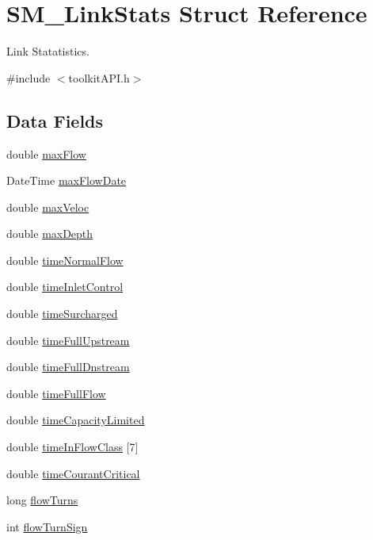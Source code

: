 \hypertarget{struct_s_m___link_stats}{}\section{S\+M\+\_\+\+Link\+Stats Struct Reference}
\label{struct_s_m___link_stats}


Link Statatistics.  




{\ttfamily \#include $<$toolkit\+A\+P\+I.\+h$>$}

\subsection*{Data Fields}
\begin{DoxyCompactItemize}
\item 
double \mbox{\hyperlink{struct_s_m___link_stats_a4d84bca5454f3903c44fe865e44674f5}{max\+Flow}}
\item 
Date\+Time \mbox{\hyperlink{struct_s_m___link_stats_a315e22b4b57846183e5c42beb0271461}{max\+Flow\+Date}}
\item 
double \mbox{\hyperlink{struct_s_m___link_stats_ad51aaaeab0403dcc9204d6fc10a150ba}{max\+Veloc}}
\item 
double \mbox{\hyperlink{struct_s_m___link_stats_a7228dabd4235761cf24edaa63c29ac5e}{max\+Depth}}
\item 
double \mbox{\hyperlink{struct_s_m___link_stats_a280dc840607ae09223dc876b8c56dd3a}{time\+Normal\+Flow}}
\item 
double \mbox{\hyperlink{struct_s_m___link_stats_aaa492ecf4dbe89b0492681c4fedfde2b}{time\+Inlet\+Control}}
\item 
double \mbox{\hyperlink{struct_s_m___link_stats_ae5c6e5a148cd0c7920e6298adccd4648}{time\+Surcharged}}
\item 
double \mbox{\hyperlink{struct_s_m___link_stats_af117df3659482483cc3893b1ff3e36aa}{time\+Full\+Upstream}}
\item 
double \mbox{\hyperlink{struct_s_m___link_stats_aaaf2b8def64575cf788c672c5096efd2}{time\+Full\+Dnstream}}
\item 
double \mbox{\hyperlink{struct_s_m___link_stats_a6a53d5ec23e7a135687343a689ac1e8a}{time\+Full\+Flow}}
\item 
double \mbox{\hyperlink{struct_s_m___link_stats_a368150c8c95f54e720cac8061d7965b0}{time\+Capacity\+Limited}}
\item 
double \mbox{\hyperlink{struct_s_m___link_stats_a760ac35ace3da05b6fc8a4ffbf1131ad}{time\+In\+Flow\+Class}} \mbox{[}7\mbox{]}
\item 
double \mbox{\hyperlink{struct_s_m___link_stats_a9b8dde5a8c0d75a55f9037adef91e309}{time\+Courant\+Critical}}
\item 
long \mbox{\hyperlink{struct_s_m___link_stats_ada1865c586b1e17558bc5f77a182fec8}{flow\+Turns}}
\item 
int \mbox{\hyperlink{struct_s_m___link_stats_adcf8d5ec953a621ed93aac9c501142c2}{flow\+Turn\+Sign}}
\end{DoxyCompactItemize}


